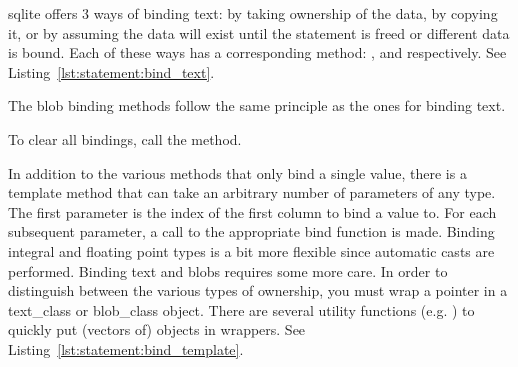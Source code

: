 \Gls{sqlite} offers 3 ways of binding text: by taking ownership of the data, by copying it, or by assuming the data will exist until the statement is freed or different data is bound. Each of these ways has a corresponding method: ,  and  respectively. See Listing~\ref{lst:statement:bind_text}.



The blob binding methods follow the same principle as the ones for binding text.

To clear all bindings, call the  method.

In addition to the various methods that only bind a single value, there is a template  method that can take an arbitrary number of parameters of any type. The first parameter is the index of the first column to bind a value to. For each subsequent parameter, a call to the appropriate bind function is made. Binding integral and floating point types is a bit more flexible since automatic casts are performed. Binding text and blobs requires some more care. In order to distinguish between the various types of ownership, you must wrap a pointer in a \gls{text_class} or \gls{blob_class} object. There are several utility functions (e.g. ) to quickly put (vectors of) objects in wrappers. See Listing~\ref{lst:statement:bind_template}.



